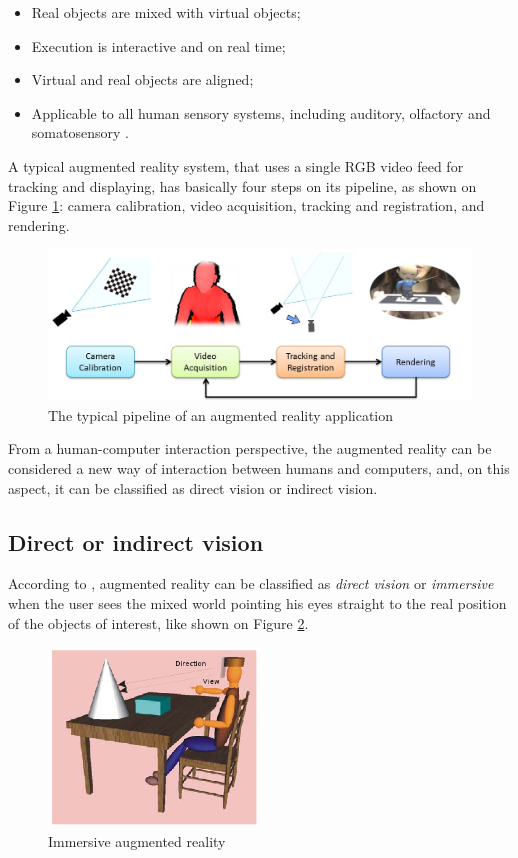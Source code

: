 \documentclass[msc, a4paper, classic, en]{ufbathesis}
\begin{document}
\begin{itemize}
  \item Real objects are mixed with virtual objects;
  \item Execution is interactive and on real time;
  \item Virtual and real objects are aligned;
  \item Applicable to all human sensory systems, including auditory, olfactory and somatosensory \cite{azuma01}.
\end{itemize}

A typical augmented reality system, that uses a single RGB video feed for tracking and displaying, has basically four steps on its pipeline, as shown on Figure \ref{fig:arpipeline}: camera calibration, video acquisition, tracking and registration, and rendering.

\begin{figure}
\centering
\includegraphics[width=1\textwidth]{images/arpipeline.png}
\caption{The typical pipeline of an augmented reality application \cite{gallo11}}
\label{fig:arpipeline}
\end{figure}

From a human-computer interaction perspective, the augmented reality can be considered a new way of interaction between humans and computers, and, on this aspect, it can be classified as direct vision or indirect vision.

\subsection{Direct or indirect vision}
\label{sec:dirind}

According to \cite{tori2006fundamentos}, augmented reality can be classified as \textit{direct vision} or \textit{immersive} when the user sees the mixed world pointing his eyes straight to the real position of the objects of interest, like shown on Figure \ref{fig:direct}.

\begin{figure}
\centering
\includegraphics[width=0.5\textwidth]{images/direct.png}
\caption{Immersive augmented reality \cite{tori2006fundamentos}}
\label{fig:direct}
\end{figure}
\end{document}
